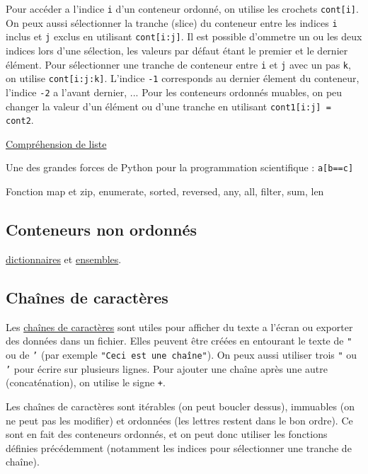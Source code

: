 \documentclass{article}
\begin{document}
Pour accéder a l'indice \texttt{i} d'un conteneur ordonné, on utilise les crochets \texttt{cont[i]}. On peux aussi sélectionner la tranche (slice) du conteneur entre les indices \texttt{i} inclus et \texttt{j} exclus en utilisant \texttt{cont[i:j]}. Il est possible d'ommetre un ou les deux indices lors d'une sélection, les valeurs par défaut étant le premier et le dernier élément. Pour sélectionner une tranche de conteneur entre \texttt{i} et \texttt{j} avec un pas \texttt{k}, on utilise \texttt{cont[i:j:k]}. L'indice \texttt{-1} corresponds au dernier élement du conteneur, l'indice \texttt{-2} a l'avant dernier, ... Pour les conteneurs ordonnés muables, on peu changer la valeur d'un élément ou d'une tranche en utilisant \texttt{cont1[i:j] = cont2}.

\href{https://docs.python.org/fr/3.6/tutorial/datastructures.html#list-comprehensions}{Compréhension de liste}

Une des grandes forces de Python pour la programmation scientifique : \texttt{a[b==c]}

Fonction map et zip, enumerate, sorted, reversed, any, all, filter, sum, len

\subsection{Conteneurs non ordonnés}
 \href{https://fr.wikibooks.org/wiki/Programmation_Python/Dictionnaires}{dictionnaires} et \href{https://fr.wikibooks.org/wiki/Programmation_Python/Ensembles}{ensembles}.
 
\subsection*{Chaînes de caractères}

Les \href{https://fr.wikibooks.org/wiki/Programmation_Python/Chaines_de_caract\%C3\%A8res}{chaînes de caractères} sont utiles pour afficher du texte a l'écran ou exporter des données dans un fichier. Elles peuvent être créées en entourant le texte de \texttt{"} ou de \texttt{'} (par exemple \texttt{"Ceci est une chaîne"}). On peux aussi utiliser trois \texttt{"} ou \texttt{'} pour écrire sur plusieurs lignes. Pour ajouter une chaîne après une autre (concaténation), on utilise le signe \texttt{+}.

Les chaînes de caractères sont itérables (on peut boucler dessus), immuables (on ne peut pas les modifier) et ordonnées (les lettres restent dans le bon ordre). Ce sont en fait des conteneurs ordonnés, et on peut donc utiliser les fonctions définies précédemment (notamment les indices pour sélectionner une tranche de chaîne).
\end{document}

